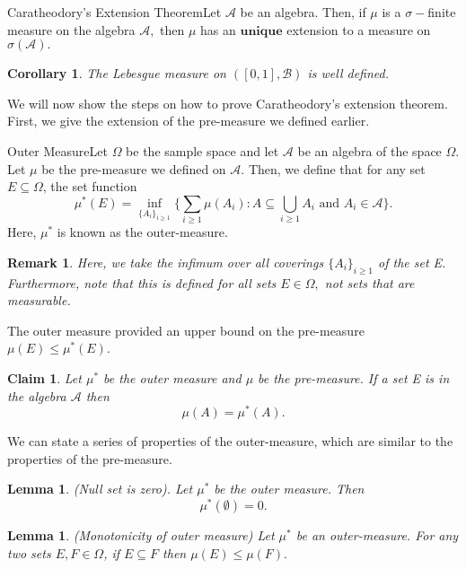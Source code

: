 \documentclass[twoside]{article}
\newtheorem{lemma}[theorem]{Lemma}
\newtheorem{claim}[theorem]{Claim}
\newtheorem{corollary}[theorem]{Corollary}
\newtheorem{remark}[theorem]{Remark}
\newcommand{\algebra}{\mathcal{A}}
\newcommand{\borelsigmaalgebra}{\mathcal{B}}
\begin{document}
\begin{theorem_exam}{Caratheodory's Extension Theorem}{}Let $\algebra$ be an algebra. Then, if $\mu$ is a $\sigma-$finite measure on the algebra $\algebra,$ then $\mu$ has an $\textbf{unique}$ extension to a measure on $\sigma(\algebra).$
\end{theorem_exam}

\begin{corollary} The Lebesgue measure on $([0,1], \borelsigmaalgebra)$ is well defined.
\end{corollary}

We will now show the steps on how to prove Caratheodory's extension theorem. First, we give the extension of the pre-measure we defined earlier.


\begin{proposition_exam}{Outer Measure}{}Let $\Omega$ be the sample space and let $\algebra$ be an algebra of the space $\Omega$. Let $\mu$ be the pre-measure we defined on $\algebra$. Then, we define that for any set $E \subseteq \Omega$, the set function
$$
\mu^*(E) = \inf_{ \{A_i\}_{i \geq 1} } \bigg\{\sum_{i \geq 1}\mu(A_i): A \subseteq \bigcup_{i \geq 1}A_i \text{ and } A_i \in \algebra \bigg\}.
$$
Here, $\mu^*$ is known as the outer-measure.
\end{proposition_exam}

\begin{remark}Here, we take the infimum over all coverings $\{A_i\}_{i \geq 1}$ of the set E. Furthermore, note that this is defined for all sets $E \in \Omega,$ not sets that are measurable.
\end{remark}

The outer measure provided an upper bound on the pre-measure $\mu(E) \leq \mu^*(E)$.

\begin{claim}Let $\mu^*$ be the outer measure and $\mu$ be the pre-measure. If a set E is in the algebra $\algebra$ then 
$$
\mu(A) = \mu^*(A).
$$
\end{claim}

We can state a series of properties of the outer-measure, which are similar to the properties of the pre-measure.

\begin{lemma}(Null set is zero). Let $\mu^*$ be the outer measure. Then 
$$
\mu^*(\emptyset) = 0.
$$
\end{lemma}

\begin{lemma}(Monotonicity of outer measure) Let $\mu^*$ be an outer-measure. For any two sets $E, F \in \Omega$, if $E \subseteq F$ then $\mu(E) \leq \mu(F).$
\end{lemma}
\end{document}
